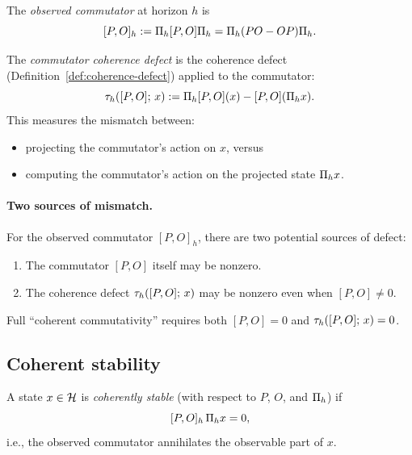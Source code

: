 \begin{definition}
\label{def:observed-commutator}
The \emph{observed commutator} at horizon $h$ is
\[
[P, O]_h := \Pi_{h} [P, O] \Pi_{h} = \Pi_{h} (PO - OP) \Pi_{h}.
\]
\end{definition}

\begin{definition}
\label{def:commutator-defect}
The \emph{commutator coherence defect} is the coherence defect (Definition~\ref{def:coherence-defect}) applied to the commutator:
\[
\tau_{h}([P,O];\, x) := \Pi_{h} [P,O](x) - [P,O](\Pi_{h} x).
\]
This measures the mismatch between:
\begin{itemize}[itemsep=0.2em]
\item projecting the commutator's action on $x$, versus
\item computing the commutator's action on the projected state $\Pi_{h} x$.
\end{itemize}
\end{definition}

\paragraph{Two sources of mismatch.}
For the observed commutator $[P,O]_h$, there are two potential sources of
defect:
\begin{enumerate}[label=(\roman*)]
\item The commutator $[P,O]$ itself may be nonzero.
\item The coherence defect $\tau_{h}([P,O];\, x)$ may be nonzero even when
      $[P,O] \ne 0$.
\end{enumerate}
Full ``coherent commutativity'' requires both $[P,O] = 0$ and
$\tau_{h}([P,O];\, x) = 0$.

\subsection{Coherent stability}

\begin{definition}
\label{def:coherently-stable}
A state $x \in \mathcal{H}$ is \emph{coherently stable} (with respect to $P$, $O$, and $\Pi_{h}$) if
\[
[P, O]_h \, \Pi_{h} x = 0,
\]
i.e., the observed commutator annihilates the observable part of $x$.
\end{definition}

